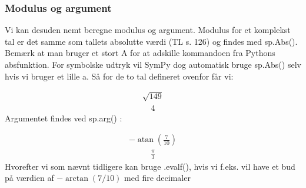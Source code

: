 \documentclass[letterpaper,10pt,english]{jupyterBook}
\begin{document}
\subsubsection{Modulus og argument}
\label{\detokenize{notebooks/sympy/Notebook_kompleks:modulus-og-argument}}
Vi kan desuden nemt beregne modulus og argument. Modulus for et komplekst tal er det samme som tallets absolutte værdi (TL s. 126) og findes med sp.Abs(). Bemærk at man bruger et stort A for at adskille kommandoen fra Pythons abs\sphinxhyphen{}funktion. For symbolske udtryk vil SymPy dog automatisk bruge sp.Abs() selv hvis vi bruger et lille a. Så for de to tal defineret ovenfor får vi:

\begin{sphinxVerbatim}[commandchars=\\\{\}]
\end{sphinxVerbatim}
\begin{equation*}
\begin{split}\displaystyle \sqrt{149}\end{split}
\end{equation*}\begin{equation*}
\begin{split}\displaystyle 4\end{split}
\end{equation*}
Argumentet findes ved sp.arg() :

\begin{sphinxVerbatim}[commandchars=\\\{\}]
\end{sphinxVerbatim}
\begin{equation*}
\begin{split}\displaystyle - \operatorname{atan}{\left(\frac{7}{10} \right)}\end{split}
\end{equation*}\begin{equation*}
\begin{split}\displaystyle \frac{\pi}{3}\end{split}
\end{equation*}
Hvorefter vi som nævnt tidligere kan bruge .evalf(), hvis vi f.eks. vil have et bud på værdien af \(-\arctan (7/10)\) med fire decimaler
\end{document}
